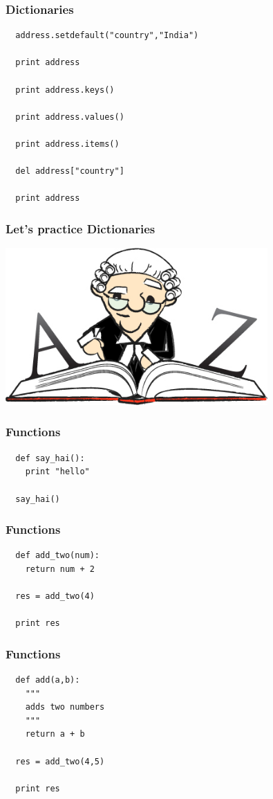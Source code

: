 \documentclass{beamer}
\begin{document}
\begin{frame}[fragile]
 \frametitle{Dictionaries}
 \begin{verbatim}
  address.setdefault("country","India")
  
  print address
  
  print address.keys()
  
  print address.values()
  
  print address.items()
  
  del address["country"]
  
  print address
 \end{verbatim}

\end{frame}

\begin{frame}[fragile]
 \frametitle{Let's practice Dictionaries}
 \includegraphics[height=6cm]{dict.jpg}
\end{frame}

\begin{frame}[fragile]
 \frametitle{Functions}
 \begin{verbatim}
  def say_hai():
    print "hello"
  
  say_hai()
 \end{verbatim}

\end{frame}

\begin{frame}[fragile]
 \frametitle{Functions}
 \begin{verbatim}
  def add_two(num):
    return num + 2
  
  res = add_two(4)
  
  print res
 \end{verbatim}

\end{frame}

\begin{frame}[fragile]
 \frametitle{Functions}
 \begin{verbatim}
  def add(a,b):
    """
    adds two numbers
    """ 
    return a + b
  
  res = add_two(4,5)
  
  print res
 \end{verbatim}

\end{frame}
\end{document}
